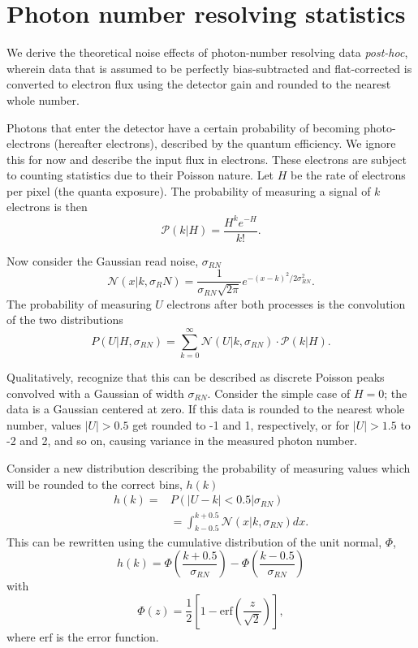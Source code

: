 \section{Photon number resolving statistics}\label{sec:pnr_derivation}

We derive the theoretical noise effects of photon-number resolving data \textit{post-hoc}, wherein data that is assumed to be perfectly bias-subtracted and flat-corrected is converted to electron flux using the detector gain and rounded to the nearest whole number.

Photons that enter the detector have a certain probability of becoming photo-electrons (hereafter electrons), described by the quantum efficiency. We ignore this for now and describe the input flux in electrons. These electrons are subject to counting statistics due to their Poisson nature. Let $H$ be the rate of electrons per pixel (the quanta exposure). The probability of measuring a signal of $k$ electrons is then
\begin{equation}
    \mathcal{P}\left(k | H\right) = \frac{H^k e^{-H}}{k!}.
\end{equation}

Now consider the Gaussian read noise, $\sigma_{RN}$
\begin{equation}
    \mathcal{N}\left(x | k, \sigma_RN\right) = \frac{1}{\sigma_{RN}\sqrt{2\pi}}e^{-(x - k)^2 / 2\sigma_{RN}^2}.
\end{equation}
The probability of measuring $U$ electrons after both processes is the convolution of the two distributions
\begin{equation}
    P(U | H, \sigma_{RN}) = \sum_{k=0}^\infty{\mathcal{N}\left(U | k, \sigma_{RN}\right)\cdot \mathcal{P}\left(k|H\right)}.
\end{equation}

Qualitatively, recognize that this can be described as discrete Poisson peaks convolved with a Gaussian of width $\sigma_{RN}$. Consider the simple case of $H=0$; the data is a Gaussian centered at zero. If this data is rounded to the nearest whole number, values $|U|>0.5$ get rounded to -1 and 1, respectively, or for $|U| > 1.5$ to -2 and 2, and so on, causing variance in the measured photon number.

Consider a new distribution describing the probability of measuring values which will be rounded to the correct bins, $h(k)$
\begin{align}
    h(k) = &P\left(|U - k| < 0.5 | \sigma_{RN}\right) \\
    &= \int_{k - 0.5}^{k + 0.5}{\mathcal{N}(x | k, \sigma_{RN}) dx}.
\end{align}
This can be rewritten using the cumulative distribution of the unit normal, $\Phi$, 
\begin{equation}
    h(k) = \Phi\left(\frac{k + 0.5}{\sigma_{RN}} \right) - \Phi\left(\frac{k - 0.5}{\sigma_{RN}} \right)
\end{equation}
with
\begin{equation}
    \Phi(z) = \frac12 \left[1 - \mathrm{erf}\left(\frac{z}{\sqrt{2}}\right) \right],
\end{equation}
where $\mathrm{erf}$ is the error function.

